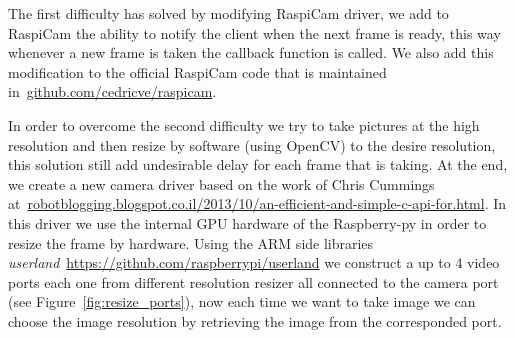 \documentclass[ twoside, 12pt ]{article}
\begin{document}
The first difficulty has solved by modifying RaspiCam driver, we add to RaspiCam the ability to notify the client when the next frame is ready, this way whenever a new frame is taken the callback function is called.
We also add this modification to the official RaspiCam code that is maintained in~\url{github.com/cedricve/raspicam}.

In order to overcome the second difficulty we try to take pictures at the high resolution and then resize by software (using OpenCV) to the desire resolution, this solution still add undesirable delay for each frame that is taking.
At the end, we create a new camera driver based on the work of Chris Cummings at~\url{robotblogging.blogspot.co.il/2013/10/an-efficient-and-simple-c-api-for.html}.
In this driver we use the internal GPU hardware of the Raspberry-py in order to resize the frame by hardware.
Using the ARM side libraries \textit{userland}~\url{https://github.com/raspberrypi/userland} we construct a up to 4 video ports each one from different resolution resizer all connected to the camera port (see Figure~\ref{fig:resize_ports}), now each time we want to take image we can choose the image resolution by retrieving the image from the corresponded port.
\end{document}

